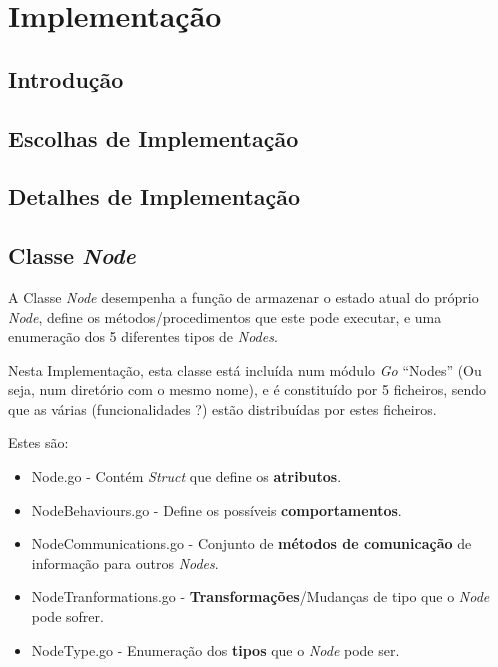 


\chapter{Implementação}
\label{chap:imp}

\section{Introdução}
\label{chap4:sec:intro}


\section{Escolhas de Implementação}
\label{chap4:escolhas_implementacao}

\section{Detalhes de Implementação}

\section{Classe \emph{Node}}
A Classe \emph{Node} desempenha a função de armazenar o estado atual do próprio \emph{Node}, define os métodos/procedimentos que este pode executar, e uma enumeração dos 5 diferentes tipos de \emph{Nodes}.

Nesta Implementação, esta classe está incluída num módulo \emph{Go} ``Nodes'' (Ou seja, num diretório com o mesmo nome), e é constituído por 5 ficheiros, sendo que as várias (funcionalidades ?) estão distribuídas por estes ficheiros.

Estes são:
\begin{itemize}
    \item Node.go - Contém \emph{Struct} que define os \textbf{atributos}.
    \item NodeBehaviours.go - Define os possíveis \textbf{comportamentos}.
    \item NodeCommunications.go - Conjunto de \textbf{métodos de comunicação} de informação para outros \emph{Nodes}.
    \item NodeTranformations.go - \textbf{Transformações}/Mudanças de tipo que o \emph{Node} pode sofrer.
    \item NodeType.go - Enumeração dos \textbf{tipos} que o \emph{Node} pode ser.
\end{itemize} 


